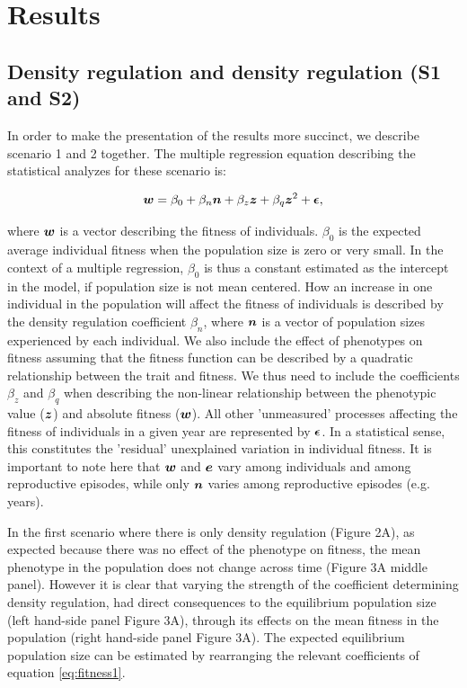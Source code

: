 \documentclass{article}
\begin{document}
\section{Results}

\subsection{Density regulation and density regulation (S1 and S2)}

In order to make the presentation of the results more succinct, we describe scenario 1 and 2 together. The multiple regression equation describing the statistical analyzes for these scenario is:

\begin{equation} \label{eq:fitness1}
\vectorsym{w}=\beta_{0} +\beta_{n} \vectorsym{n} + \beta_{z} \vectorsym{z} + \beta_{q} \vectorsym{z}^2 + \vectorsym{\epsilon},
\end{equation}

\noindent where $\vectorsym{w}$ is a vector describing the fitness of individuals. $\beta_{0}$ is the expected average individual fitness when the population size is zero or very small. In the context of a multiple regression, $\beta_{0}$ is thus a constant estimated as the intercept in the model, if population size is not mean centered. How an increase in one individual in the population will affect the fitness of individuals is described by the density regulation coefficient $\beta_{n}$, where $\vectorsym{n}$ is a vector of population sizes experienced by each individual. We also include the effect of phenotypes on fitness assuming that the fitness function can be described by a quadratic relationship between the trait and fitness. We thus need to include the coefficients $\beta_{z}$ and $\beta_{q}$ when describing the non-linear relationship between the phenotypic value ($\vectorsym{z}$) and absolute fitness ($\vectorsym{w}$). All other 'unmeasured' processes affecting the fitness of individuals in a given year are represented by $ \vectorsym{\epsilon}$. In a statistical sense, this constitutes the 'residual' unexplained variation in individual fitness. It is important to note here that $\vectorsym{w}$ and $\vectorsym{e}$ vary among individuals and among reproductive episodes, while only $\vectorsym{n}$ varies among reproductive episodes (e.g. years).

In the first scenario where there is only density regulation (Figure 2A), as expected because there was no effect of the phenotype on fitness, the mean phenotype in the population does not change across time (Figure 3A middle panel). However it is clear that varying the strength of the coefficient determining density regulation, had direct consequences to the equilibrium population size (left hand-side panel Figure 3A), through its effects on the mean fitness in the population (right hand-side panel Figure 3A). The expected equilibrium population size can be estimated by rearranging the relevant coefficients of equation \ref{eq:fitness1}.
\end{document}
